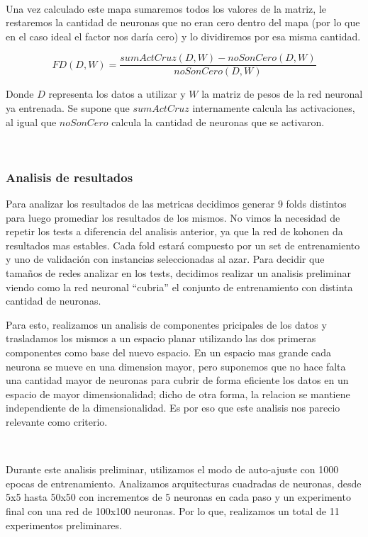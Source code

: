 \documentclass[informe.tex]{subfiles}
\begin{document}
      ~
      
      Una vez calculado este mapa sumaremos todos los valores de la matriz, le restaremos la cantidad de neuronas que no eran cero dentro del mapa (por lo que en el caso ideal el factor nos daría cero) y lo dividiremos por esa misma cantidad.
      
      $$FD(D, W) = \frac{sumActCruz(D, W) - noSonCero(D, W)}{noSonCero(D, W)}$$
      
      Donde $D$ representa los datos a utilizar y $W$ la matriz de pesos de la red neuronal ya entrenada. Se supone que $sumActCruz$ internamente calcula las activaciones, al igual que $noSonCero$ calcula la cantidad de neuronas que se activaron.
      
      ~

      \subsubsection{Analisis de resultados}
      Para analizar los resultados de las metricas decidimos generar 9 folds distintos para luego promediar los resultados de los mismos. No vimos la necesidad de repetir los tests a diferencia del analisis anterior, ya que la red de kohonen da resultados mas estables. Cada fold estar\'a compuesto por un set de entrenamiento y uno de validaci\'on con instancias seleccionadas al azar. Para decidir que tama\~nos de redes analizar en los tests, decidimos realizar un analisis preliminar viendo como la red neuronal ``cubria'' el conjunto de entrenamiento con distinta cantidad de neuronas.
      ~
      
      Para esto, realizamos un analisis de componentes pricipales de los datos y trasladamos los mismos a un espacio planar utilizando las dos primeras componentes como base del nuevo espacio. En un espacio mas grande cada neurona se mueve en una dimension mayor, pero suponemos que no hace falta una cantidad mayor de neuronas para cubrir de forma eficiente los datos en un espacio de mayor dimensionalidad; dicho de otra forma, la relacion se mantiene independiente de la dimensionalidad. Es por eso que este analisis nos parecio relevante como criterio.
      
      ~
      
      Durante este analisis preliminar, utilizamos el modo de auto-ajuste con 1000 epocas de entrenamiento. Analizamos arquitecturas cuadradas de neuronas, desde 5x5 hasta 50x50 con incrementos de 5 neuronas en cada paso y un experimento final con una red de 100x100 neuronas. Por lo que, realizamos un total de 11 experimentos preliminares.
      
\end{document}
